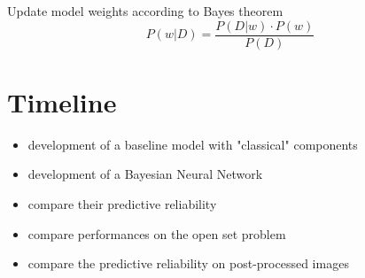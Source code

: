 \documentclass[fleqn,compress,utf8,aspectratio=169,t,handout]{beamer}
\begin{document}
\begin{frame}
  Update model weights according to Bayes theorem
  \vfill
  \centering
  \begin{equation}
    P(w|D) = \frac{P(D|w) \cdot P(w)}{P(D)}
  \end{equation}
  \vfill
\end{frame}





\section{Timeline}
\begin{frame}
\begin{itemize}
    \item development of a baseline model with "classical" components
    \item development of a Bayesian Neural Network
    \item compare their predictive reliability
    \item compare performances on the open set problem
    \item compare the predictive reliability on post-processed images
    
\end{itemize}
\end{frame}
\end{document}

